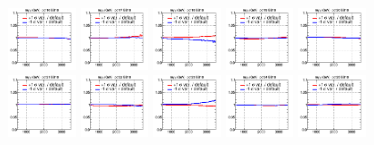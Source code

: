 \begin{figure}[!htbp]
{{\includegraphics[width=0.16\textwidth]{fig/spectra__pdf16_BB18_ADDGRW.png}
\includegraphics[width=0.16\textwidth]{fig/spectra__pdf17_BB18_ADDGRW.png}
\includegraphics[width=0.16\textwidth]{fig/spectra__pdf18_BB18_ADDGRW.png}
\includegraphics[width=0.16\textwidth]{fig/spectra__pdf19_BB18_ADDGRW.png}
\includegraphics[width=0.16\textwidth]{fig/spectra__pdf20_BB18_ADDGRW.png}\\
\includegraphics[width=0.16\textwidth]{fig/spectra__pdf21_BB18_ADDGRW.png}
\includegraphics[width=0.16\textwidth]{fig/spectra__pdf22_BB18_ADDGRW.png}
\includegraphics[width=0.16\textwidth]{fig/spectra__pdf23_BB18_ADDGRW.png}
\includegraphics[width=0.16\textwidth]{fig/spectra__pdf24_BB18_ADDGRW.png}
\includegraphics[width=0.16\textwidth]{fig/spectra__pdf25_BB18_ADDGRW.png}\\


}}
\end{figure}
